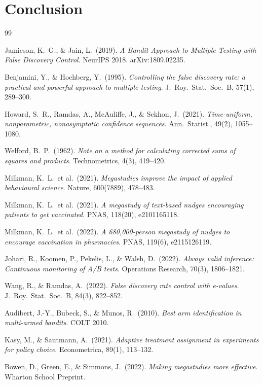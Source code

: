 \documentclass[11pt,a4paper]{article}
\begin{document}

\section{Conclusion}
\label{sec:conclusion}


\newpage
\begin{thebibliography}{99}

Jamieson, K.~G., \& Jain, L.\ (2019).
\textit{A Bandit Approach to Multiple Testing with False Discovery Control}.
NeurIPS 2018. arXiv:1809.02235.

Benjamini, Y., \& Hochberg, Y.\ (1995).
\textit{Controlling the false discovery rate: a practical and powerful approach
to multiple testing}.
J.\ Roy.\ Stat.\ Soc.\ B, 57(1), 289--300.

Howard, S.~R., Ramdas, A., McAuliffe, J., \& Sekhon, J.\ (2021).
\textit{Time-uniform, nonparametric, nonasymptotic confidence sequences}.
Ann.\ Statist., 49(2), 1055--1080.

Welford, B.~P.\ (1962).
\textit{Note on a method for calculating corrected sums of squares and products}.
Technometrics, 4(3), 419--420.

Milkman, K.~L.\ et al.\ (2021).
\textit{Megastudies improve the impact of applied behavioural science}.
Nature, 600(7889), 478--483.

Milkman, K.~L.\ et al.\ (2021).
\textit{A megastudy of text-based nudges encouraging patients to get vaccinated}.
PNAS, 118(20), e2101165118.

Milkman, K.~L.\ et al.\ (2022).
\textit{A 680,000-person megastudy of nudges to encourage vaccination in pharmacies}.
PNAS, 119(6), e2115126119.

Johari, R., Koomen, P., Pekelis, L., \& Walsh, D.\ (2022).
\textit{Always valid inference: Continuous monitoring of A/B tests}.
Operations Research, 70(3), 1806--1821.

Wang, R., \& Ramdas, A.\ (2022).
\textit{False discovery rate control with e-values}.
J.\ Roy.\ Stat.\ Soc.\ B, 84(3), 822--852.

Audibert, J.-Y., Bubeck, S., \& Munos, R.\ (2010).
\textit{Best arm identification in multi-armed bandits}.
COLT 2010.

Kasy, M., \& Sautmann, A.\ (2021).
\textit{Adaptive treatment assignment in experiments for policy choice}.
Econometrica, 89(1), 113--132.

Bowen, D., Green, E., \& Simmons, J.\ (2022).
\textit{Making megastudies more effective}.
Wharton School Preprint.

\end{thebibliography}
\end{document}
